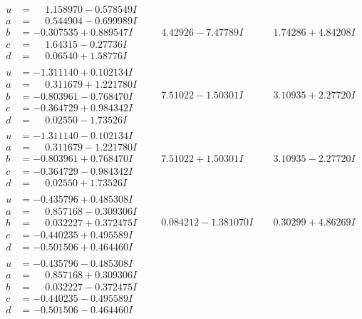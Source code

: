 \documentclass[1p]{elsarticle_modified}
\theoremstyle{definition}
\begin{document}
$$\begin{array}{c|c|c}
\begin{aligned}
u &= \phantom{-}1.158970 - 0.578549 I \\
a &= \phantom{-}0.544904 - 0.699989 I \\
b &= -0.307535 + 0.889547 I \\
c &= \phantom{-}1.64315 - 0.27736 I \\
d &= \phantom{-}0.06540 + 1.58776 I\end{aligned}
 & \phantom{-}4.42926 - 7.47789 I & \phantom{-}1.74286 + 4.84208 I \\ \hline\begin{aligned}
u &= -1.311140 + 0.102134 I \\
a &= \phantom{-}0.311679 + 1.221780 I \\
b &= -0.803961 - 0.768470 I \\
c &= -0.364729 + 0.984342 I \\
d &= \phantom{-}0.02550 - 1.73526 I\end{aligned}
 & \phantom{-}7.51022 - 1.50301 I & \phantom{-}3.10935 + 2.27720 I \\ \hline\begin{aligned}
u &= -1.311140 - 0.102134 I \\
a &= \phantom{-}0.311679 - 1.221780 I \\
b &= -0.803961 + 0.768470 I \\
c &= -0.364729 - 0.984342 I \\
d &= \phantom{-}0.02550 + 1.73526 I\end{aligned}
 & \phantom{-}7.51022 + 1.50301 I & \phantom{-}3.10935 - 2.27720 I \\ \hline\begin{aligned}
u &= -0.435796 + 0.485308 I \\
a &= \phantom{-}0.857168 - 0.309306 I \\
b &= \phantom{-}0.032227 + 0.372475 I \\
c &= -0.440235 + 0.495589 I \\
d &= -0.501506 + 0.464460 I\end{aligned}
 & \phantom{-}0.084212 - 1.381070 I & \phantom{-}0.30299 + 4.86269 I \\ \hline\begin{aligned}
u &= -0.435796 - 0.485308 I \\
a &= \phantom{-}0.857168 + 0.309306 I \\
b &= \phantom{-}0.032227 - 0.372475 I \\
c &= -0.440235 - 0.495589 I \\
d &= -0.501506 - 0.464460 I\end{aligned}

\end{array}$$
\end{document}
